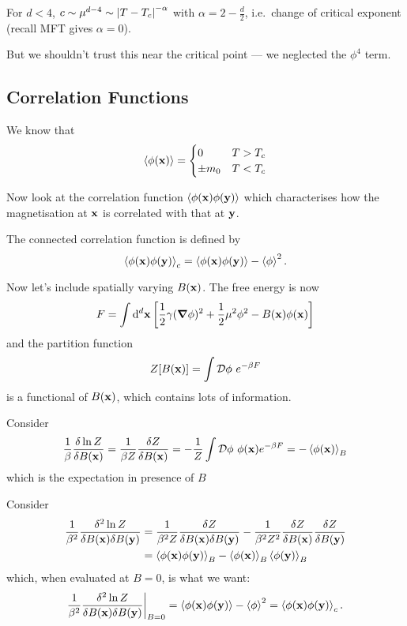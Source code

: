 \documentclass[a4paper,11pt]{article}
\begin{document}
	For $d < 4$, $c \sim \mu ^{d-4} \sim \abs{T - T_c}^{-\alpha}$ with $\alpha = 2 - \frac{d}{2}$, i.e.\ change of critical exponent (recall MFT gives $\alpha = 0$).

	But we shouldn't trust this near the critical point --- we neglected the $\phi^4$ term.


	\subsection{Correlation Functions}  
	
	We know that 
	\[
		\expval{\phi(\vb x)} = \begin{cases}
			0 & T> T_c\\
			\pm m_0 & T < T_c
		\end{cases}
	\]
	
	Now look at the correlation function $\expval{\phi(\vb x)\phi(\vb y)}$ which characterises how the magnetisation at $\vb x$ is correlated with that at $\vb y$.
	
	The connected correlation function is defined by
	\[
		\expval{\phi(\vb x)\phi(\vb y)}_c = \expval{\phi(\vb x)\phi(\vb y)} - \expval{\phi}^2.
	\]
	
	Now let's include spatially varying $B(\vb x)$. The free energy is now
	\[
		F = \int \dd[d]{\vb x} \left[ \frac{1}{2} \gamma (\grad \phi)^2 + \frac{1}{2} \mu^2 \phi^2 - B(\vb x)\phi(\vb x) \right]
	\]
	and the partition function
	\[
		Z[B(\vb x)]=\int \mathcal{D} \phi\ e ^{-\beta F}
	\]
	is a functional of $B(\vb x)$, which contains lots of information.

	Consider
	\[
		\frac{1}{\beta} \frac{\delta \ln Z}{\delta B(\vb x)} = \frac{1}{\beta Z}\frac{\delta Z}{\delta B(\vb x)} = - \frac{1}{Z}\int \mathcal{D} \phi\ \phi(\vb x)e ^{-\beta F} = - \expval{\phi(\vb x)}_B
	\]
	which is the expectation in presence of $B$

	Consider
	\begin{align*}
		\frac{1}{\beta^2} \frac{\delta^2 \ln Z}{\delta B(\vb x) \delta B(\vb y)} & = \frac{1}{\beta^2 Z}\frac{\delta Z}{\delta B(\vb x)\delta B(\vb y)} - \frac{1}{\beta^2 Z^2} \frac{\delta Z}{\delta B(\vb x)} \frac{\delta Z}{\delta B(\vb y)}\\
		& = \expval{\phi(\vb x)\phi(\vb y)}_B - \expval{\phi(\vb x)}_B \expval{\phi(\vb y)}_B
	\end{align*}
	which, when evaluated at $B = 0$, is what we want: 
	\begin{equation}
		\frac{1}{\beta^2} \frac{\delta^2 \ln Z}{\delta B(\vb x) \delta B(\vb y)}\bigg|_{B=0} = \expval{\phi(\vb x)\phi(\vb y)} - \expval{\phi}^2 = \expval{\phi(\vb x)\phi(\vb y)}_c.
		\label{eq:2.2.1}
	\end{equation}
\end{document}
